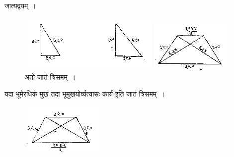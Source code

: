 \documentclass[11pt, openany]{book}
\begin{document}
जात्यद्वयम्~। 
\vspace{-2mm}

\begin{figure}[h!]
         \centering
         \includegraphics[scale=0.85]{graphics/capture157.png}
\vspace{-2mm}
         \captionsetup{labelformat=empty}
         \caption{अतो जातं त्रिसमम्~।}
         \includegraphics[scale=0.85]{graphics/capture158.png}
     \end{figure}
\vspace{-2mm}

यदा भूमेरधिकं मुखं तदा भूमुखयोर्व्यत्यासः कार्य इति जातं त्रिसमम्~। 
\vspace{-2mm}

\begin{figure}[h!]
         \centering
         \includegraphics[scale=0.85]{graphics/capture159.png}
     \end{figure}

\newpage%
\end{document}
